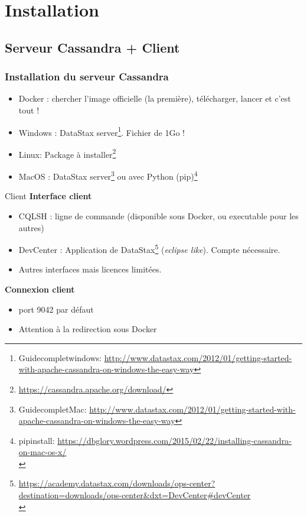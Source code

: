 \section{Installation}

\subsection{Serveur Cassandra + Client}
\begin{frame}
	\frametitle{Installation du serveur Cassandra}
	
	\begin{itemize}
		\item \alert{Docker} : chercher l'image officielle (la première), télécharger, lancer
		et c'est tout !
		\item \alert{Windows} : DataStax server\footnote{Guide\;complet\;windows\;: \url{http://www.datastax.com/2012/01/getting-started-with-apache-cassandra-on-windows-the-easy-way}}.
		\danger Fichier de 1Go !
		\item \alert{Linux}: Package à installer\footnote{\url{https://cassandra.apache.org/download/}}
		\item \alert{MacOS} : DataStax server\footnote{Guide\;complet\;Mac\;: \url{http://www.datastax.com/2012/01/getting-started-with-apache-cassandra-on-windows-the-easy-way}}
		ou avec Python (pip)\footnote{pip\;install\;: \url{https://dbglory.wordpress.com/2015/02/22/installing-cassandra-on-mac-os-x/}\\}
	\end{itemize}
\end{frame}

\begin{frame}[fragile]{Client}
\textbf{Interface client}
\begin{itemize}
	\item \alert{CQLSH} : ligne de commande (disponible sous Docker, ou executable pour les autres)
	\item \alert{DevCenter} : Application de DataStax\footnote{\url{https://academy.datastax.com/downloads/ops-center?destination=downloads/ops-center&dxt=DevCenter#devCenter}\\} (\textit{eclipse like}). Compte nécessaire.
	\item Autres interfaces mais licences limitées.
\end{itemize}
\vfill

\textbf{Connexion client}
\begin{itemize}
	\item \alert{port 9042} par défaut
	\item Attention à la redirection sous Docker
\end{itemize}
\end{frame}

